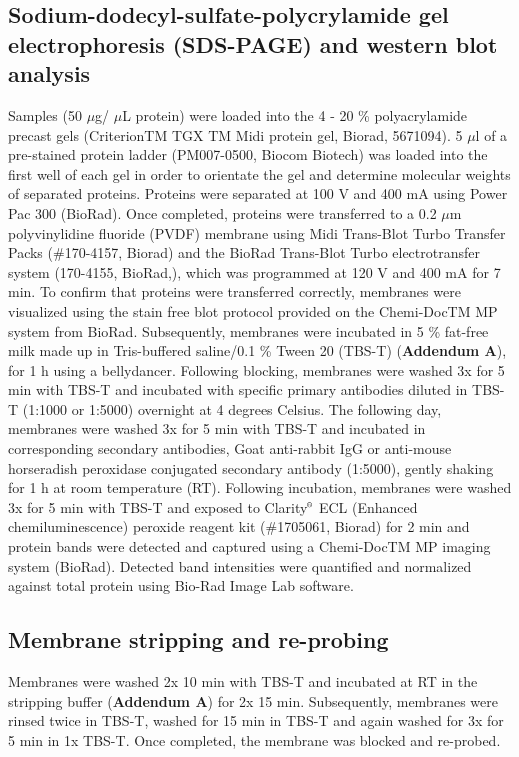 \subsection{Sodium-dodecyl-sulfate-polycrylamide gel electrophoresis (SDS-PAGE) and western blot analysis}\label{sec:SDS_PAGE}
Samples (50 $\mu$g/ $\mu$L protein) were loaded into the 4 - 20 \% polyacrylamide precast gels (CriterionTM TGX TM Midi protein gel, Biorad, 5671094). 5 $\mu$l of a pre-stained protein ladder (PM007-0500, Biocom Biotech) was loaded into the first well of each gel in order to orientate the gel and determine molecular weights of separated proteins. Proteins were separated at 100 V and 400 mA using Power Pac 300 (BioRad). Once completed, proteins were transferred to a 0.2 $\mu$m polyvinylidine fluoride (PVDF) membrane using Midi Trans-Blot Turbo Transfer Packs (\#170-4157, Biorad) and the BioRad Trans-Blot Turbo electrotransfer system (170-4155, BioRad,), which was programmed at 120 V and 400 mA for 7 min. To confirm that proteins were transferred correctly, membranes were visualized using the stain free blot protocol provided on the Chemi-DocTM MP system from BioRad. Subsequently, membranes were incubated in 5 \% fat-free milk made up in Tris-buffered saline/0.1 \% Tween 20 (TBS-T) (\textbf{Addendum A}), for 1 h using a bellydancer. Following blocking, membranes were washed 3x for 5 min with TBS-T and incubated with specific primary antibodies diluted in TBS-T (1:1000 or 1:5000) overnight at 4 degrees Celsius. The following day, membranes were washed 3x for 5 min with TBS-T and incubated in corresponding secondary antibodies, Goat anti-rabbit IgG or anti-mouse horseradish peroxidase conjugated secondary antibody (1:5000), gently shaking for 1 h at room temperature (RT). Following incubation, membranes were washed 3x for 5 min with TBS-T and exposed to Clarity${\textsuperscript{\tiny{\textregistered}}}$ ECL (Enhanced chemiluminescence) peroxide reagent kit (\#1705061, Biorad) for 2 min and protein bands were detected and captured using a Chemi-DocTM MP imaging system (BioRad). Detected band intensities were quantified and normalized against total protein using Bio-Rad Image Lab software.

\subsection{Membrane stripping and re-probing}
Membranes were washed 2x 10 min with TBS-T and incubated at RT in the stripping buffer (\textbf{Addendum A}) for 2x 15 min. Subsequently, membranes were rinsed twice in TBS-T, washed for 15 min in TBS-T and again washed for 3x for 5 min in 1x TBS-T. Once completed, the membrane was blocked and re-probed.

